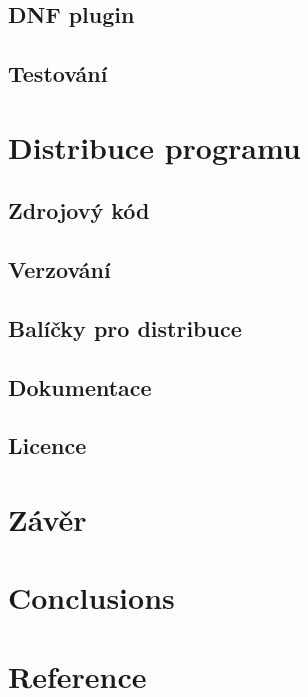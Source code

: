 \documentclass[10pt,a4paper]{article}
\begin{document}
		\subsection{DNF plugin}
		\subsection{Testování}

	\section{Distribuce programu}
		\subsection{Zdrojový kód}
		\subsection{Verzování}
		\subsection{Balíčky pro distribuce}
		\subsection{Dokumentace}
		\subsection{Licence}

	\section{Závěr} %
	\section{Conclusions} %
	\section{Reference} %

\end{document}
